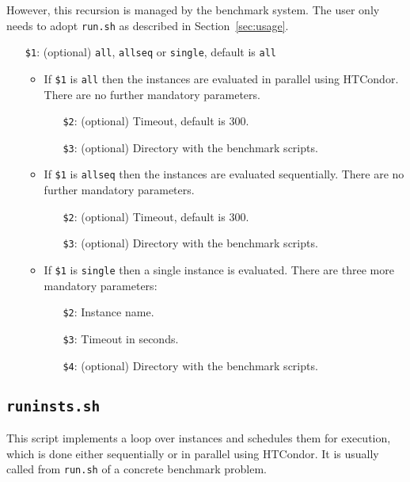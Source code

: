 \documentclass[a4paper]{article}
\begin{document}
		    However, this recursion is managed by the benchmark system.
		    The user only needs to adopt {\tt run.sh} as described in Section~\ref{sec:usage}.
		
		    \medskip{}
		    \begin{itemize}
				\item[{\tt \$1}:] (optional) {\tt all}, {\tt allseq} or {\tt single}, default is {\tt all}
					\begin {itemize}
						\item If {\tt \$1} is {\tt all} then the instances are evaluated in parallel using HTCondor. There are no further mandatory parameters.
							\begin{itemize}
								\item[{\tt \$2}:] (optional) Timeout, default is $300$.
								\item[{\tt \$3}:] (optional) Directory with the benchmark scripts.
							\end{itemize}
						\item If {\tt \$1} is {\tt allseq} then the instances are evaluated sequentially. There are no further mandatory parameters.
							\begin{itemize}
								\item[{\tt \$2}:] (optional) Timeout, default is $300$.
								\item[{\tt \$3}:] (optional) Directory with the benchmark scripts.
							\end{itemize}
						\item If {\tt \$1} is {\tt single} then a single instance is evaluated. There are three more mandatory parameters:
							\begin{itemize}
								\item[{\tt \$2}:] Instance name.
								\item[{\tt \$3}:] Timeout in seconds.
								\item[{\tt \$4}:] (optional) Directory with the benchmark scripts.
							\end{itemize}
					\end{itemize}
		    \end{itemize}
				
		\subsection{\tt runinsts.sh}
		\label{sec:architecture:runinsts}
		
		    This script implements a loop over instances and schedules them for execution,
		    which is done either sequentially or in parallel using HTCondor.
		    It is usually called from {\tt run.sh} of a concrete benchmark problem.
		    
\end{document}
